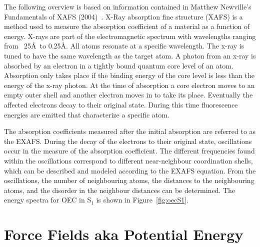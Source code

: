 The following overview is based on information contained in Matthew Newville’s Fundamentals of XAFS (2004)~\cite{newville2004fundamentals}. X-Ray absorption fine structure (XAFS) is a method used to measure the absorption coefficient of a material as a function of energy. X-rays are part of the electromagnetic spectrum with wavelengths ranging from ~25\AA\ to 0.25\AA. All atoms resonate at a specific wavelength. The x-ray is tuned to have the same wavelength as the target atom. A photon from an x-ray is absorbed by an electron in a tightly bound quantum core level of an atom. Absorption only takes place if the binding energy of the core level is less than the energy of the x-ray photon. At the time of absorption a core electron moves to an empty outer shell and another electron moves in to take its place. Eventually the affected electrons decay to their original state. During this time fluorescence energies are emitted that characterize a specific atom.

The absorption coefficients measured after the initial absorption are referred to as the EXAFS. During the decay of the electrons to their original state, oscillations occur in the measure of the absorption coefficient. The different frequencies found within the oscillations correspond to different near-neighbour coordination shells, which can be described and modeled according to the EXAFS equation. From the oscillations, the number of neighbouring atoms, the distances to the neighbouring atoms, and the disorder in the neighbour distances can be determined. The energy spectra for OEC in S$_{1}$ is shown in Figure~\ref{fig:oecS1}.

\begin{figure*}
	\caption{EXAFS Spectra of OEC in S$_{1}$}
	\label{fig:oecS1}
\end{figure*}

\section{Force Fields aka Potential Energy}

